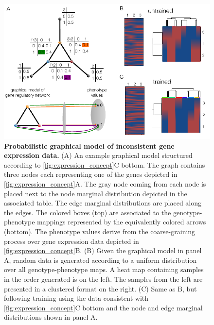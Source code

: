 \begin{figure}[!ht]
\centering
\noindent\includegraphics[width=0.9\columnwidth]{fig/inconsistentthreecycle.pdf}
\caption{{\bf Probabilistic graphical model of inconsistent gene expression data.} (A) An example graphical model structured according to \ref{fig:expression_concept}C bottom. The graph contains three nodes each representing one of the genes depicted in \ref{fig:expression_concept}A. The gray node coming from each node is placed next to the node marginal distribution depicted in the associated table. The edge marginal distributions are placed along the edges. The colored boxes (top) are associated to the genotype-phenotype mappings represented by the equivalently colored arrows (bottom). The phenotype values derive from the coarse-graining process over gene expression data depicted in \ref{fig:expression_concept}B. (B) Given the graphical model in panel A, random data is generated according to a uniform distribution over all genotype-phenotype maps. A heat map containing samples in the order generated is on the left. The samples from the left are presented in a clustered format on the right. (C) Same as B, but following training using the data consistent with \ref{fig:expression_concept}C bottom and the node and edge marginal distributions shown in panel A.}
\label{fig:inconsistentthreecycle}
\end{figure}

